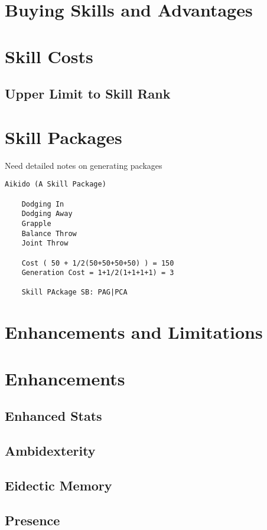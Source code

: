 \section{Buying Skills and Advantages}
\section{Skill Costs}
\subsection{Upper Limit to Skill Rank}
\section{Skill Packages}

Need detailed notes on generating packages

\begin{verbatim}
Aikido (A Skill Package)

	Dodging In
	Dodging Away
	Grapple
	Balance Throw
	Joint Throw

	Cost ( 50 + 1/2(50+50+50+50) ) = 150
	Generation Cost = 1+1/2(1+1+1+1) = 3

	Skill PAckage SB: PAG|PCA

\end{verbatim}

\section{Enhancements and Limitations}
\section{Enhancements}
\subsection{Enhanced Stats}


\subsection{Ambidexterity}
\subsection{Eidectic Memory}
\subsection{Presence}
